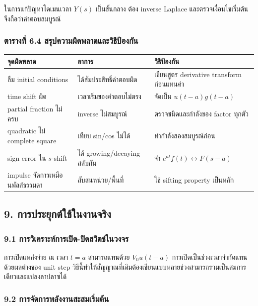 ในการแก้ปัญหาโดเมนเวลา $Y(s)$ เป็นขั้นกลาง ต้อง inverse Laplace และตรวจเงื่อนไขเริ่มต้นจึงถือว่าคำตอบสมบูรณ์

\subsubsection{ตารางที่ 6.4 สรุปความผิดพลาดและวิธีป้องกัน}

\begin{table}[htbp]
    \centering
    \begin{tabular}{l l l}
        \hline
        \textbf{จุดผิดพลาด} & \textbf{อาการ} & \textbf{วิธีป้องกัน} \\
        \hline
        ลืม initial conditions & ได้สัมประสิทธิ์คำตอบผิด & เขียนสูตร derivative transform ก่อนแทนค่า \\
        time shift ผิด & เวลาเริ่มของคำตอบไม่ตรง & จัดเป็น $u(t-a)g(t-a)$ \\
        partial fraction ไม่ครบ & inverse ไม่สมบูรณ์ & ตรวจชนิดและกำลังของ factor ทุกตัว \\
        quadratic ไม่ complete square & เทียบ sin/cos ไม่ได้ & ทำกำลังสองสมบูรณ์ก่อน \\
        sign error ใน $s$-shift & ได้ growing/decaying สลับกัน & จำ $e^{at}f(t)\leftrightarrow F(s-a)$ \\
        impulse จัดการเหมือนพัลส์ธรรมดา & สับสนหน่วย/พื้นที่ & ใช้ sifting property เป็นหลัก \\
        \hline
    \end{tabular}
\end{table}



\subsection{9. การประยุกต์ใช้ในงานจริง}

\subsubsection{9.1 การวิเคราะห์การเปิด-ปิดสวิตช์ในวงจร}

การเปิดแหล่งจ่าย ณ เวลา $t=a$ สามารถแทนด้วย $V_0u(t-a)$ การเปิดเป็นช่วงเวลาจำกัดแทนด้วยผลต่างของ unit step วิธีนี้ทำให้สัญญาณที่เดิมต้องเขียนแบบหลายช่วงสามารถรวมเป็นสมการเดียวและแปลงลาปลาซได้

\subsubsection{9.2 การจัดการพลังงานสะสมเริ่มต้น}

